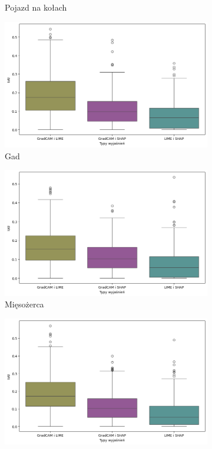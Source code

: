 \begin{figure}[!h]
\begin{subfigure}[b]{0.3\textwidth}
		\caption{Pojazd na kołach}  \label{}
	\end{subfigure}
	\begin{subfigure}[b]{0.3\textwidth}
		\centering\includegraphics[width=.9\textwidth]{img/base_coherence_reptile}
		\caption{Gad}  \label{}
	\end{subfigure}
	\begin{subfigure}[b]{0.3\textwidth}
		\centering\includegraphics[width=.9\textwidth]{img/base_coherence_carnivore}
		\caption{Mięsożerca}  \label{}
	\end{subfigure}
	\begin{subfigure}[b]{0.3\textwidth}
		\centering\includegraphics[width=.9\textwidth]{img/base_coherence_insect}

\end{subfigure}
\end{figure}
